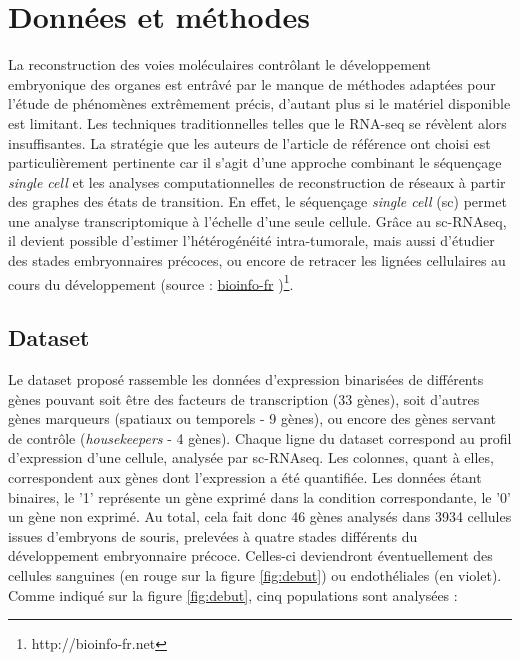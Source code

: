 \documentclass[fleqn,11pt]{SelfArx} %
\begin{document}

\section{Données et méthodes}
La reconstruction des voies moléculaires contrôlant le développement embryonique des organes est entrâvé par le manque de méthodes adaptées pour l'étude de phénomènes extrêmement précis, d'autant plus si le matériel disponible est limitant. Les techniques traditionnelles telles que le RNA-seq se révèlent alors insuffisantes. La stratégie que les auteurs de l'article de référence ont choisi est particulièrement pertinente car il s'agit d'une approche combinant le séquençage \textit{single cell} et les analyses computationnelles de reconstruction de réseaux à partir des graphes des états de transition. En effet, le séquençage \textit{single cell} (sc) permet une analyse transcriptomique à l'échelle d'une seule cellule. Grâce au sc-RNAseq, il devient possible d'estimer l'hétérogénéité intra-tumorale, mais aussi d'étudier des stades embryonnaires précoces, ou encore de retracer les lignées cellulaires au cours du développement (source : \href{http://bioinfo-fr.net/single-cell-sequencing?hilite=single+cell+RNA-seq}{bioinfo-fr} )\footnote{http://bioinfo-fr.net}. 


\subsection{Dataset}
Le dataset proposé rassemble les données d'expression binarisées de différents gènes pouvant soit être des facteurs de transcription (33 gènes), soit d'autres gènes marqueurs (spatiaux ou temporels - 9 gènes), ou encore des gènes servant de contrôle (\textit{housekeepers} - 4 gènes). Chaque ligne du dataset correspond au profil d'expression d'une cellule, analysée par sc-RNAseq. Les colonnes, quant à elles, correspondent aux gènes dont l'expression a été quantifiée. Les données étant binaires, le '1' représente un gène exprimé dans la condition correspondante, le '0' un gène non exprimé. Au total, cela fait donc 46 gènes analysés dans 3934 cellules issues d’embryons de souris, prelevées à quatre stades différents du développement embryonnaire précoce. Celles-ci deviendront éventuellement des cellules sanguines (en rouge sur la figure \ref{fig:debut}) ou endothéliales (en violet). Comme indiqué sur la figure \ref{fig:debut}, cinq populations sont analysées :
\end{document}
